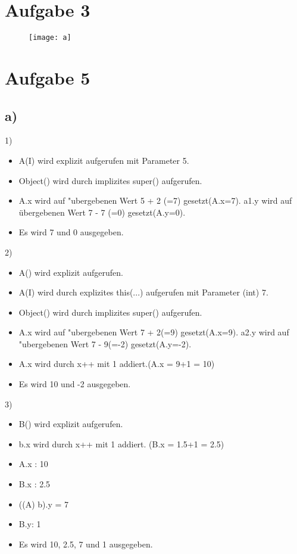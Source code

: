 \documentclass[a4paper,11pt]{scrartcl}
\begin{document}
\section*{Aufgabe 3}

	\begin{figure}[h]
		\texttt{[image: a]}
		\centering
	\end{figure}

\section*{Aufgabe 5}
\subsection*{a)}
	1)
	\begin{itemize}
		\item A(I) wird explizit aufgerufen mit Parameter 5.
		\item Object() wird durch implizites super() aufgerufen.
		\item A.x wird auf "ubergebenen Wert 5 + 2 (=7) gesetzt(A.x=7). a1.y wird auf übergebenen Wert 7 - 7 (=0) gesetzt(A.y=0).
		\item Es wird 7 und 0 ausgegeben.
	\end{itemize}
	2)
	\begin{itemize}
		\item A() wird explizit aufgerufen.
		\item A(I) wird durch explizites this(...) aufgerufen mit Parameter (int) 7.
		\item Object() wird durch implizites super() aufgerufen.
		\item A.x wird auf "ubergebenen Wert 7 + 2(=9) gesetzt(A.x=9). a2.y wird auf "ubergebenen Wert 7 - 9(=-2) gesetzt(A.y=-2).
		\item A.x wird durch x++ mit 1 addiert.(A.x = 9+1 = 10)
		\item Es wird 10 und -2 ausgegeben.
	\end{itemize}
	3)
	\begin{itemize}
		\item B() wird explizit aufgerufen.
		\item b.x wird durch x++ mit 1 addiert. (B.x = 1.5+1 = 2.5)
		\item A.x : 10
		\item B.x : 2.5
		\item ((A) b).y = 7
		\item B.y: 1
		\item Es wird 10, 2.5, 7 und 1 ausgegeben.
	\end{itemize}
\end{document}
